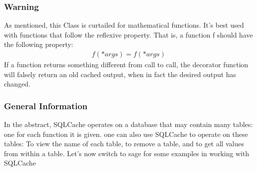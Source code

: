 \documentclass{beamer}
\begin{document}
\begin{frame}
\frametitle{Warning}
As mentioned, this Class is curtailed for mathematical functions. It's best used with functions that follow the reflexive property. That is, a function f should have the following property:
\begin{align}
f(*args) = f(*args)
\end{align}
If a function returns something different from call to call, the decorator function will falsely return an old cached output, when in fact the desired output has changed.
\end{frame}

\begin{frame}
\frametitle{General Information}
In the abstract, SQLCache operates on a database that may contain many tables: one for each function it is given. one can also use SQLCache to operate on these tables: To view the name of each table, to remove a table, and to get all values from within a table. Let's now switch to sage for some examples in working with SQLCache
\end{frame}
\end{document}
